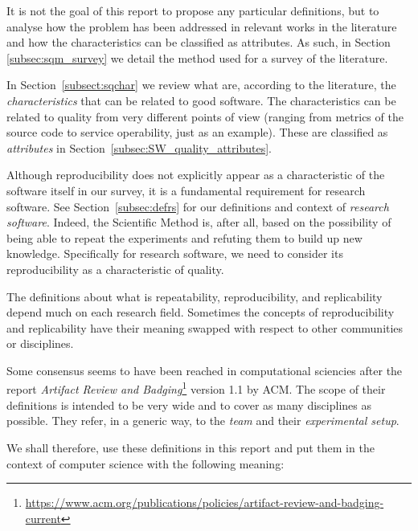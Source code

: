 It is not the goal of this report to propose any particular definitions, but to analyse how the problem has been addressed in relevant works in the literature and how the characteristics can be classified as attributes. As such, in Section \ref{subsec:sqm_survey} we detail the method used for a survey of the literature.

In Section~\ref{subsect:sqchar} we review what are, according to the literature, the \textit{characteristics} that can be related to good software. The characteristics can be related to quality from very different points of view (ranging from metrics of the source code to service operability, just as an example). These  are classified as \textit{attributes} in Section~\ref{subsec:SW_quality_attributes}.

Although reproducibility does not explicitly appear as a characteristic of the software itself in our survey, it is a fundamental requirement for research software. See Section~\ref{subsec:defrs} for our definitions and context of \textit{research software}. Indeed, the Scientific Method is, after all, based on the possibility of being able to repeat the experiments and refuting them to build up new knowledge. Specifically for research software, we need to consider its reproducibility as a characteristic of quality.

The definitions about what is repeatability, reproducibility, and replicability depend much on each research field. Sometimes the concepts of reproducibility and replicability have their meaning swapped with respect to other communities or disciplines.

Some consensus seems to have been reached in computational sciencies after the report \textit{Artifact Review and Badging}\footnote{\url{https://www.acm.org/publications/policies/artifact-review-and-badging-current}} version 1.1 by ACM. The scope of their definitions is intended to be very wide and to cover as many disciplines as possible. They refer, in a generic way, to the \textit{team} and their \textit{experimental setup}.

We shall therefore, use these definitions in this report and put them in the context of computer science with the following meaning:


